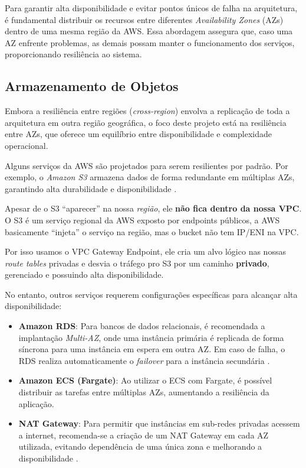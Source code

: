 Para garantir alta disponibilidade e evitar pontos únicos de falha na arquitetura, é fundamental distribuir os recursos entre diferentes \textit{Availability Zones} (AZs) dentro de uma mesma região da AWS. Essa abordagem assegura que, caso uma AZ enfrente problemas, as demais possam manter o funcionamento dos serviços, proporcionando resiliência ao sistema.

\subsection{Armazenamento de Objetos}\label{sec:metod-s3}
Embora a resiliência entre regiões (\textit{cross-region}) envolva a replicação de toda a arquitetura em outra região geográfica, o foco deste projeto está na resiliência entre AZs, que oferece um equilíbrio entre disponibilidade e complexidade operacional.

Alguns serviços da AWS são projetados para serem resilientes por padrão. Por exemplo, o \textit{Amazon S3} armazena dados de forma redundante em múltiplas AZs, garantindo alta durabilidade e disponibilidade \cite{netapp2024ha}.

Apesar de o S3 “aparecer” na nossa \textit{região}, ele \textbf{não fica dentro da nossa VPC}. O S3 é um serviço regional da AWS exposto por endpoints públicos, a AWS basicamente “injeta” o serviço na região, mas o bucket não tem IP/ENI na VPC. 

Por isso usamos o VPC Gateway Endpoint, ele cria um alvo lógico nas nossas \textit{route tables} privadas e desvia o tráfego pro S3 por um caminho \textbf{privado}, gerenciado e possuindo alta disponibilidade. 

No entanto, outros serviços requerem configurações específicas para alcançar alta disponibilidade:

\begin{itemize}
  \item \textbf{Amazon RDS}: Para bancos de dados relacionais, é recomendada a implantação \textit{Multi-AZ}, onde uma instância primária é replicada de forma síncrona para uma instância em espera em outra AZ. Em caso de falha, o RDS realiza automaticamente o \textit{failover} para a instância secundária \cite{aws2024rds}.
  
  \item \textbf{Amazon ECS (Fargate)}: Ao utilizar o ECS com Fargate, é possível distribuir as tarefas entre múltiplas AZs, aumentando a resiliência da aplicação.
  
  \item \textbf{NAT Gateway}: Para permitir que instâncias em sub-redes privadas acessem a internet, recomenda-se a criação de um NAT Gateway em cada AZ utilizada, evitando dependência de uma única zona e melhorando a disponibilidade \cite{aws2024nat}.
\end{itemize}

